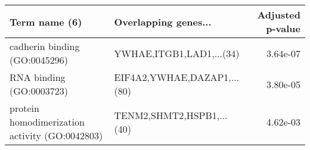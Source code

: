 \begin{tabular}{llr}
\toprule
                                 Term name (6) &        Overlapping genes... &  Adjusted p-value \\
\midrule
                 cadherin binding (GO:0045296) &    YWHAE,ITGB1,LAD1,...(34) &          3.64e-07 \\
                      RNA binding (GO:0003723) & EIF4A2,YWHAE,DAZAP1,...(80) &          3.80e-05 \\
protein homodimerization activity (GO:0042803) &   TENM2,SHMT2,HSPB1,...(40) &          4.62e-03 \\
\bottomrule
\end{tabular}
